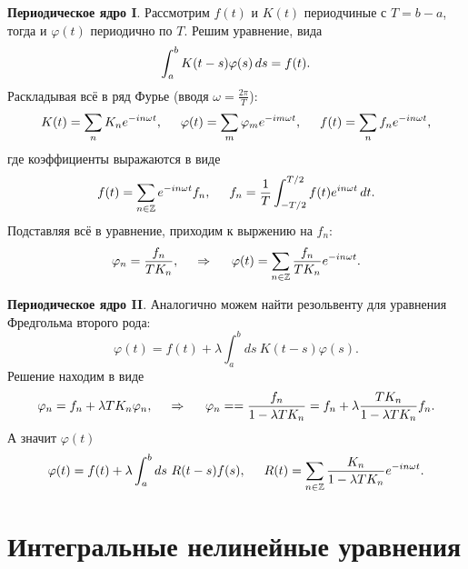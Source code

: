 \textbf{Периодическое ядро I}. Рассмотрим $f(t)$ и $K(t)$ периодчиные с $T = b-a$, тогда и $\varphi(t)$ периодично по $T$. Решим уравнение, вида
\begin{equation*}
	\int_{a}^{b} K(t-s) \varphi(s) \, d s = f(t).
\end{equation*}
Раскладывая всё в ряд Фурье (вводя $\omega = \frac{2\pi}{T}$):
\begin{equation*}
	K(t) = \sum_n K_n e^{-i n \omega t},
	\hspace{5 mm} 
	\varphi(t) = \sum_m \varphi_m e^{-i m \omega t},
	\hspace{5 mm} 
	f(t) = \sum_n f_n e^{-in \omega t},
\end{equation*}
где коэффициенты выражаются в виде
\begin{equation*}
	f(t) = \sum_{n \in \mathbb{Z}} e^{-in \omega t} f_n,
	\hspace{5 mm} f_n = \frac{1}{T} \int_{-T/2}^{T/2} f(t) e^{i n \omega t} \, d t.
\end{equation*}
Подставляя всё в уравнение, приходим к выржению на $f_n$:
\begin{equation}
	\varphi_n = \frac{f_n}{T K_n},
	\hspace{0.5cm} \Rightarrow \hspace{0.5cm}
	\varphi(t) = \sum_{n \in \mathbb{Z}} \frac{f_n}{T K_n} e^{-i n \omega t}.
\end{equation}

\textbf{Периодическое ядро II}. Аналогично можем найти резольвенту для уравнения Фредгольма второго рода:
\begin{equation*}
	\varphi(t) = f(t) +  \lambda \int_{a}^{b} ds\ K(t-s) \varphi(s).
\end{equation*}
Решение находим в виде
\begin{equation*}
	\varphi_n = f_n + \lambda T K_n \varphi_n,
	\hspace{0.5cm} \Rightarrow \hspace{0.5cm}
	\varphi_n = = \frac{f_n}{1-\lambda T K_n} = f_n + \lambda \frac{T K_n}{1-\lambda T K_n} f_n.
\end{equation*}
А значит $\varphi(t)$
\begin{equation}
	\varphi(t) = f(t) + \lambda \int_{a}^{b} ds\ R(t-s) f(s),
	\hspace{5 mm} 
	R(t) = \sum_{n \in \mathbb{Z}} \frac{K_n}{1-\lambda T K_n} e^{-i n \omega t}.
\end{equation}



\section{Интегральные нелинейные уравнения}


